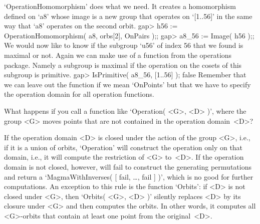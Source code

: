 `OperationHomomorphism' does what  we need.   It creates a   homomorphism
defined on `a8' whose image is a new group  that operates on `[1..56]' in
the same way that `a8' operates on the second orbit.
\beginexample
    gap> h56 := OperationHomomorphism( a8, orbs[2], OnPairs );;
    gap> a8_56 := Image( h56 );;
\endexample
We would now like to know if the subgroup `u56' of index 56 that we found
is  maximal or  not.   Again  we can make  use  of  a function  from  the
operations package.  Namely a subgroup is maximal if the operation on the
cosets of  this subgroup is primitive.
\beginexample
    gap> IsPrimitive( a8_56, [1..56] );
    false 
\endexample
Remember that we  can leave out the  function  if we mean  `OnPoints' but
that we have to specify the operation domain for all operation functions.

\exercise What happens if  you call a function  like `Operation( <G>, <D>
)',  where the group  <G>  moves points  that are   not contained in  the
operation domain~<D>?

\answer If the  operation domain <D> is  closed  under the action  of the
group <G>, i.e., if  it is a union of  orbits, `Operation' will construct
the operation only on that domain, i.e.,  it will compute the restriction
of <G> to~<D>. If  the operation domain  is  not closed, however,  {\GAP}
will   fail to construct  the     generating permutations and return    a
`MagmaWithInverses( [ fail,  \dots,  fail  ] )',  which  is no  good  for
further computations. An exception to this rule is the function `Orbits':
if  <D> is not   closed under <G>, then    `Orbits( <G>, <D> )'  silently
replaces  <D> by its  closure under <G>  and then computes the orbits. In
other words, it  computes all <G>-orbits that contain  at least one point
from the original~<D>.

